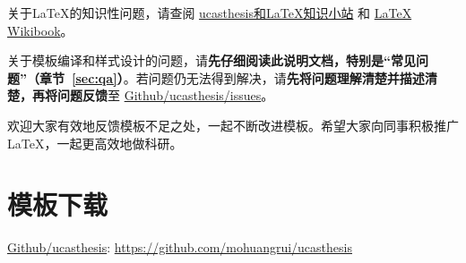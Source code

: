 关于\LaTeX{}的知识性问题，请查阅 \href{https://github.com/mohuangrui/ucasthesis/wiki}{ucasthesis和\LaTeX{}知识小站} 和 \href{https://en.wikibooks.org/wiki/LaTeX}{\LaTeX{} Wikibook}。

关于模板编译和样式设计的问题，请\textbf{先仔细阅读此说明文档，特别是“常见问题”（章节~\ref{sec:qa}）}。若问题仍无法得到解决，请\textbf{先将问题理解清楚并描述清楚，再将问题反馈}至 \href{https://github.com/mohuangrui/ucasthesis/issues}{Github/ucasthesis/issues}。

欢迎大家有效地反馈模板不足之处，一起不断改进模板。希望大家向同事积极推广\LaTeX{}，一起更高效地做科研。

\section{模板下载}

\begin{center}
    \href{https://github.com/mohuangrui/ucasthesis}{Github/ucasthesis}: \url{https://github.com/mohuangrui/ucasthesis}
\end{center}
